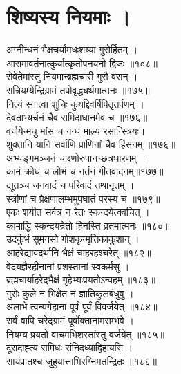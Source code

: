 
\section{शिष्यस्य नियमाः ।}

अग्नीन्धनं भैक्षचर्यामधःशय्यां गुरोर्हितम् ।\\[-2mm]
आसमावर्तनात्कुर्यात्कृतोपनयनो द्विजः ॥१०८॥\\
सेवेतेमांस्तु नियमान्ब्रह्मचारी गुरौ वसन् ।\\[-2mm]
सन्नियम्येन्द्रिग्रामं तपोवृद्ध्यर्थमात्मनः ॥१७५॥\\
नित्यं स्नात्वा शुचिः कुर्याद्देवर्षिपितृतर्पणम् ।\\[-2mm]
देवताभ्यर्चनं चैव समिदाधानमेव च ॥१७६॥\\
वर्जयेन्मधु मांसं च गन्धं माल्यं रसान्स्त्रियः।\\[-2mm]
शुक्तानि यानि सर्वाणि प्राणिनां चैव हिंसनम् ॥१७६॥\\
अभ्यङ्गमञ्जनं चाक्ष्णोरुपानच्छत्रधारणम् ।\\[-2mm]
कामं क्रोधं च लोभं च नर्तनं गीतवादनम्॥१७७॥\\
द्यूतञ्च जनवादं च परिवादं तथानृतम् ।\\[-2mm]
स्त्रीणां च प्रेक्षणालम्भमुपघातं परस्य च ॥१७९॥\\
एकः शयीत सर्वत्र न रेतः स्कन्दयेत्क्वचित् ।\\[-2mm]
कामाद्धि स्कन्दयन्रेतो हिनस्ति व्रतमात्मनः ॥१८०॥\\
उदकुंभं सुमनसो गोशकृन्मृत्तिकाकुशान् ।\\[-2mm]
आहरेद्यावदर्थानि भैक्षं चाहरहश्चरेत् ॥१८२॥\\
वेदयज्ञैरहीनानां प्रशस्तानां स्वकर्मसु ।\\[-2mm]
ब्रह्मचार्याहरेद्भैक्षं गृहेभ्यःप्रयतोऽन्वहम् ॥१८३॥\\
गुरोः कुले न भिक्षेत न ज्ञातिकुलबंधुषु ।\\[-2mm]
अलाभे त्वन्यगेहानां पूर्वं पूर्वं विवर्जयेत् ॥१८४॥\\
सर्वं वापि चरेद्ग्रामं पूर्वोक्तानामसम्भवे ।\\[-2mm]
नियम्य प्रयतो वाचमभिशस्तांस्तु वर्जयेत् ॥१८५॥\\
दूरादाह्त्य समिधः संनिदध्याद्विहायसि ।\\[-2mm]
सायंप्रातश्च जुहुयात्ताभिरग्निमतन्द्रितः ॥१८६॥\\
